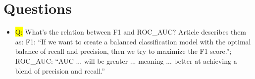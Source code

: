 \documentclass[12pt,a4paper]{article}
\begin{document}
\section*{Questions}
\begin{itemize}
\item \colorbox{yellow}{Q:} What's the relation between F1 and ROC\_AUC? Article describes them as: F1: ``If we want to create a balanced classification model with the optimal balance of recall and precision, then we try to maximize the F1 score.''; ROC\_AUC: ``AUC ... will be greater ... meaning ... better at achieving a blend of precision and recall.''
%
\end{itemize}
\end{document}
